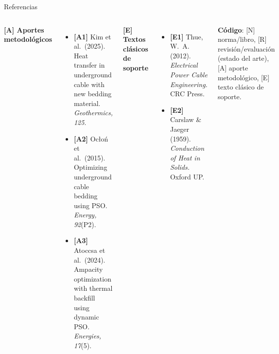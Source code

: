 \documentclass[aspectratio=169]{beamer}
\begin{document}
\begin{frame}{Referencias}
\begin{columns}[T]

{\footnotesize\color{orange!70!black}\textbf{[A] Aportes metodológicos}}
\vspace{0.1pt}
\begin{itemize}[leftmargin=*,itemsep=1pt]\scriptsize
  \item \textbf{[A1]} Kim et al.\ (2025). Heat transfer in underground cable
        with new bedding material. \textit{Geothermics, 125}.
  \item \textbf{[A2]} Ocłoń et al.\ (2015). Optimizing underground cable
        bedding using PSO. \textit{Energy, 92}(P2).
  \item \textbf{[A3]} Atoccsa et al.\ (2024). Ampacity optimization with
        thermal backfill using dynamic PSO. \textit{Energies, 17}(5).
\end{itemize}

\vspace{0.1pt}
{\footnotesize\color{gray!70!black}\textbf{[E] Textos clásicos de soporte}}
\vspace{0.1pt}
\begin{itemize}[leftmargin=*,itemsep=1pt]\scriptsize
  \item \textbf{[E1]} Thue, W.~A. (2012). \textit{Electrical Power Cable
        Engineering.} CRC Press.
  \item \textbf{[E2]} Carslaw \& Jaeger (1959). \textit{Conduction of Heat
        in Solids.} Oxford UP.
\end{itemize}

\vspace{0.1pt}
\begin{block}{}\scriptsize
\textbf{Código}: \textcolor{blue!60!black}{[N]} norma/libro,
\textcolor{teal!70!black}{[R]} revisión/evaluación (estado del arte),
\textcolor{orange!70!black}{[A]} aporte metodológico,
\textcolor{gray!70!black}{[E]} texto clásico de soporte.
\end{block}

\end{columns}
\end{frame}
\end{document}

